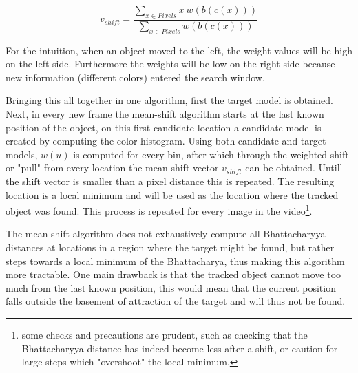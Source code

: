 \documentclass[a4paper,11pt]{article}
\begin{document}
\begin{equation}
\label{eq:shift vector}
v_{shift}=\frac{\sum_{x\in Pixels} x \ w(b(c(x)))}{\sum_{x\in Pixels} w(b(c(x)))}
\end{equation} %

    

For the intuition, when an object moved to the left, the weight values will be high on the left side. Furthermore the weights will be low on the right side because new information (different colors) entered the search window. 

 

Bringing this all together in one algorithm, first the target model is obtained. Next, in every new frame the mean-shift algorithm starts at the last known position of the object, on this first candidate location a candidate model is created by computing the color histogram. Using both candidate and target models, $w(u)$ is computed for every bin, after which through the weighted shift or "pull" from every location the mean shift vector $v_{shift}$ can be obtained. Untill the shift vector is smaller than a pixel distance this is repeated. The resulting location is a local minimum and will be used as the location where the tracked object was found. This process is repeated for every image in the video\footnote{some checks and precautions are prudent, such as checking that the Bhattacharyya distance has indeed become less after a shift, or caution for large steps which "overshoot" the local minimum. }.



The mean-shift algorithm does not exhaustively compute all Bhattacharyya distances at locations in a region where the target might be found, but rather steps towards a local minimum of the Bhattacharya, thus making this algorithm more tractable. One main drawback is that the tracked object cannot move too much from the last known position, this would mean that the current position falls outside the basement of attraction of the target and will thus not be found. 







\end{document}
